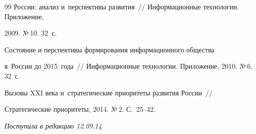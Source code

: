 {{\begin{thebibliography}{99}
России: анализ и~перспективы развития~/\!\!/ Информационные технологии. Приложение,

2009. №\,10. 32~с.


 Состояние и перспективы формирования информационного общества

в~России до 2015~года~/\!\!/ Информационные технологии. Приложение, 2010. №\,6. 32~с.




 Вызовы XXI века и~стратегические приоритеты развития России~/\!\!/

Стратегические приоритеты, 2014. №\,2. С.~25--42.



\end{thebibliography}

} }





\vspace*{-3pt}



\hfill{\small\textit{Поступила в редакцию 12.09.14}}



\newpage






















\def\tit{SOME APPROACHES TO FORMING REGULATORY

AND~TECHNICAL BASE FOR~CREATION OF~UNIFIED INFORMATION SPACE OF~RUSSIA}



\def\titkol{Some approaches to forming regulatory and technical

base for %

unified information space} %



